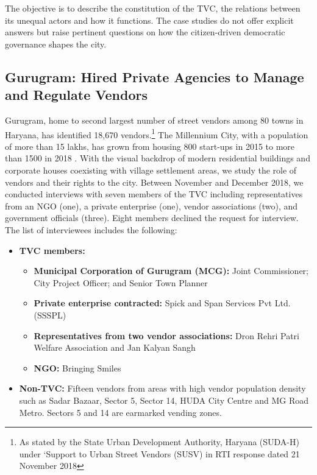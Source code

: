 \documentclass[a4paper, 12pt, twoside]{article}
\begin{document}
{The objective is to describe the constitution of the TVC, the relations between its unequal actors and how it functions. The case studies do not offer explicit answers but raise pertinent questions on how the citizen-driven democratic governance shapes the city.

\subsection*{Gurugram: Hired Private Agencies to Manage and Regulate Vendors}

Gurugram, home to second largest number of street vendors among 80 towns in Haryana, has identified 18,670 vendors.\footnote{As stated by the State Urban Development Authority, Haryana (SUDA-H) under ‘Support to Urban Street Vendors (SUSV) in RTI response dated 21 November 2018} The Millennium City, with a population of more than 15 lakhs, has grown from housing 800 start-ups in 2015 to more than 1500 in 2018 \parencite{vermanews}. With the visual backdrop of modern residential buildings and corporate houses coexisting with village settlement areas, we study the role of vendors and their rights to the city.
Between November and December 2018, we conducted interviews with seven members of the TVC including representatives from an NGO (one), a private enterprise (one), vendor associations (two), and government officials (three). Eight members declined the request for interview. The list of interviewees includes the following:

\begin{itemize}
\item \textbf{TVC members:}
	\begin{itemize}
	\item \textbf{Municipal Corporation of Gurugram (MCG):} Joint Commissioner; City Project Officer; and Senior Town Planner
	\item \textbf{Private enterprise contracted:} Spick and Span Services Pvt Ltd. (SSSPL)
	\item \textbf{Representatives from two vendor associations:} Dron Rehri Patri Welfare Association and Jan Kalyan Sangh
	\item \textbf{NGO:} Bringing Smiles
	\end{itemize}
\item \textbf{Non-TVC:} Fifteen vendors from areas with high vendor population density such as Sadar Bazaar, Sector 5, Sector 14, HUDA City Centre and MG Road Metro. Sectors 5 and 14 are earmarked vending zones.
\end{itemize}

}
\end{document}
